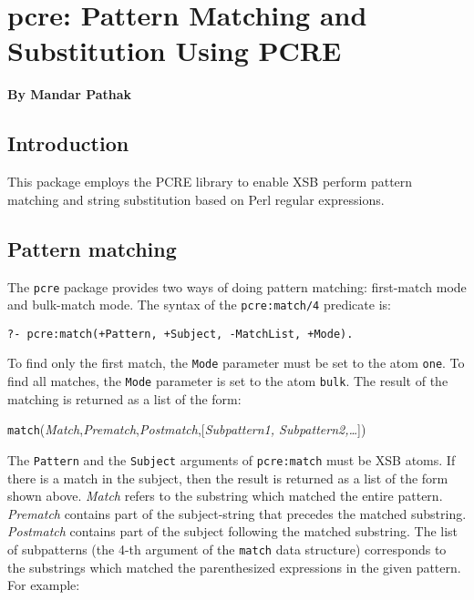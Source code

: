 
\chapter{pcre: Pattern Matching and Substitution Using PCRE}
\label{chap-pcre}

\begin{center}
{\Large {\bf By Mandar Pathak}}
\end{center}

\section{Introduction}

This package employs the PCRE library to enable XSB perform pattern
matching and string substitution based on Perl regular expressions.

\section{Pattern matching}

The {\tt pcre} package provides two ways of doing pattern matching:
first-match mode and bulk-match mode. The syntax of the {\tt pcre:match/4}
predicate is:

\begin{verbatim}
?- pcre:match(+Pattern, +Subject, -MatchList, +Mode).
\end{verbatim}

To find only the first match, the {\tt Mode}  parameter must be set to the atom
{\tt one}. To find all matches, the {\tt Mode}  parameter is set to the atom
{\tt bulk}. The result of the matching is returned as a list of 
the form:

\begin{center}
\texttt{match}(\textit{Match},\textit{Prematch},\textit{Postmatch},[\textit{Subpattern1, Subpattern2,\ldots}])
\end{center}

The {\tt Pattern} and the {\tt Subject} arguments of {\tt pcre:match} must
be XSB atoms. If there is a match in the subject, then the result is
returned as a list of the form shown above. \textit{Match} refers to the
substring which matched the entire pattern. \textit{Prematch} contains part
of the subject-string that precedes the matched substring.
\textit{Postmatch} contains part of the subject following the matched
substring. The list of subpatterns (the 4-th argument of the {\tt match}
data structure) corresponds to the substrings which matched the
parenthesized expressions in the given pattern. For example:

